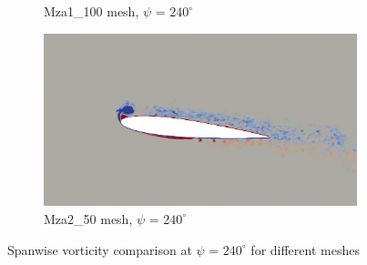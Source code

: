 \begin{figure}[H]
\begin{subfigure}[b]{0.475\textwidth}
		\caption{Mza1\_100 mesh, $\psi$ = $240^\circ$}
		\label{fig:Mza1_100_Re200k_sp_psi240}
	\end{subfigure}
	\begin{subfigure}[b]{0.475\textwidth}
		\centering
		\includegraphics[width=1\textwidth]{figures/zonal_adapt_results/vorticity_plots_Re200k/Mza2_50/phase_240.png}
		\caption{Mza2\_50 mesh, $\psi$ = $240^\circ$}
		\label{fig:Mza2_50_Re200k_sp_psi240}
	\end{subfigure}	
	\caption{Spanwise vorticity comparison at $\psi$ = $240^\circ$ for different meshes}
	\label{fig:vorticity_Re200k_sp_240}
\end{figure}

